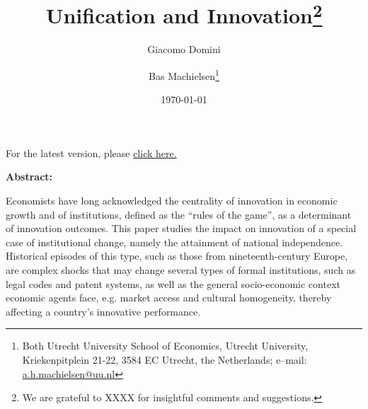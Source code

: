 

\title{Unification and Innovation\footnote{We are grateful to XXXX for insightful comments and suggestions.}}
\author{Giacomo Domini \and Bas Machielsen\footnote{Both Utrecht University School of Economics, Utrecht University, Kriekenpitplein 21-22, 3584 EC Utrecht, the Netherlands; e--mail: \href{mailto:a.h.machielsen@uu.nl}{a.h.machielsen@uu.nl}}}
\date{\today}



\maketitle

\begin{center}
    For the latest version, please \href{http://link.com/paper.pdf}{click here.}
\end{center}

\begin{center} \textbf{Abstract:} \end{center}


\noindent Economists have long acknowledged the centrality of innovation in economic growth and of institutions, defined as the “rules of the game”, as a determinant of innovation outcomes. This paper studies the impact on innovation of a special case of institutional change, namely the attainment of national independence. Historical episodes of this type, such as those from nineteenth-century Europe, are complex shocks that may change several types of formal institutions, such as legal codes and patent systems, as well as the general socio-economic context economic agents face, e.g. market access and cultural homogeneity, thereby affecting a country's innovative performance.


